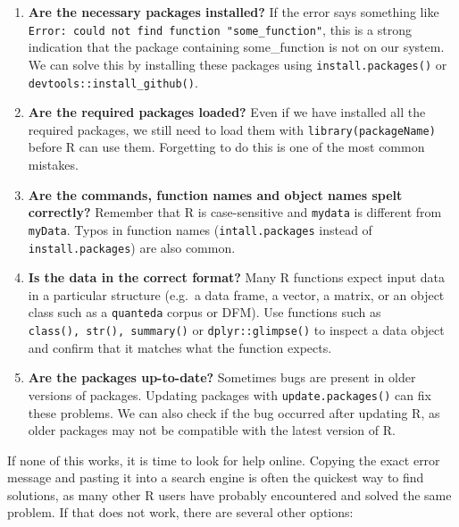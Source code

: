 \documentclass[
]{book}
\begin{document}
\begin{enumerate}
\def\labelenumi{\arabic{enumi}.}
\item
  \textbf{Are the necessary packages installed?} If the error says something like \texttt{Error:\ could\ not\ find\ function\ "some\_function"}, this is a strong indication that the package containing some\_function is not on our system. We can solve this by installing these packages using \texttt{install.packages()} or \texttt{devtools::install\_github()}.
\item
  \textbf{Are the required packages loaded?} Even if we have installed all the required packages, we still need to load them with \texttt{library(packageName)} before R can use them. Forgetting to do this is one of the most common mistakes.
\item
  \textbf{Are the commands, function names and object names spelt correctly?} Remember that R is case-sensitive and \texttt{mydata} is different from \texttt{myData}. Typos in function names (\texttt{intall.packages} instead of \texttt{install.packages}) are also common.
\item
  \textbf{Is the data in the correct format?} Many R functions expect input data in a particular structure (e.g.~a data frame, a vector, a matrix, or an object class such as a \texttt{quanteda} corpus or DFM). Use functions such as \texttt{class(),\ str(),\ summary()} or \texttt{dplyr::glimpse()} to inspect a data object and confirm that it matches what the function expects.
\item
  \textbf{Are the packages up-to-date?} Sometimes bugs are present in older versions of packages. Updating packages with \texttt{update.packages()} can fix these problems. We can also check if the bug occurred after updating R, as older packages may not be compatible with the latest version of R.
\end{enumerate}

If none of this works, it is time to look for help online. Copying the exact error message and pasting it into a search engine is often the quickest way to find solutions, as many other R users have probably encountered and solved the same problem. If that does not work, there are several other options:
\end{document}
